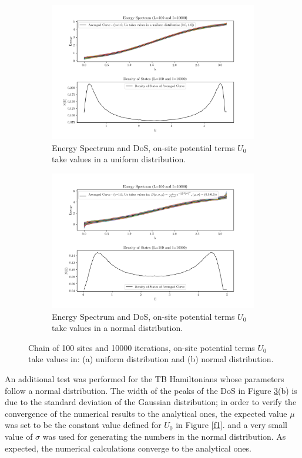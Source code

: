 \documentclass[12pt]{article}
\begin{document}
\begin{figure}[ht]
		\centering
        \begin{subfigure}[a]{\textwidth}
        		\centering
                \includegraphics[scale=0.65]{EDOSCRU.png}
                \caption{Energy Spectrum and DoS, on-site potential terms $U_{0}$ take values in a uniform distribution.}
                \label{f2a}
        \end{subfigure}
        \begin{subfigure}[b]{\textwidth}
        		\centering
                \includegraphics[scale=0.65]{EDOSCRN.png}
                \caption{ Energy Spectrum and DoS, on-site potential terms $U_{0}$ take values in a normal distribution.}
                \label{f2b}
        \end{subfigure}
        \caption{Chain of 100 sites and 10000 iterations, on-site potential terms $U_{0}$ take values in: (a) uniform distribution and (b)  normal distribution.}
        \label{f2}
\end{figure}
An additional test was performed for the TB Hamiltonians whose parameters follow a normal distribution. The width of the peaks of the DoS in Figure \ref{f2}(b) is due to the standard deviation of the Gaussian distribution; in order to verify the convergence of the numerical results to the analytical ones, the expected value $\mu$ was set to be the constant value defined for $U_{0}$ in Figure \ref{f1}. and a very small value of $\sigma$ was used for generating the numbers in the normal distribution. As expected, the numerical calculations converge to the analytical ones.\\
\end{document}
